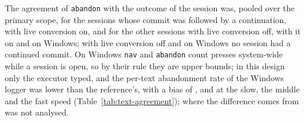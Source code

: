 The agreement of \texttt{abandon} with the outcome of the session was, pooled over the primary scope, for the sessions
whose commit was followed by a continuation,  with live
conversion on, and for the other sessions  with live
conversion off,  with it on and
 on Windows; with live conversion off and on Windows no session
had a continued commit. On Windows \texttt{nav} and \texttt{abandon} count presses system-wide while a session is open,
so by their rule they are upper bounds; in this design only the executor typed, and the per-text abandonment rate of the
Windows logger was lower than the reference's, with a bias of ,
 and  at the slow, the
middle and the fast speed (Table~\ref{tab:text-agreement}); where the difference comes from was not analysed.



